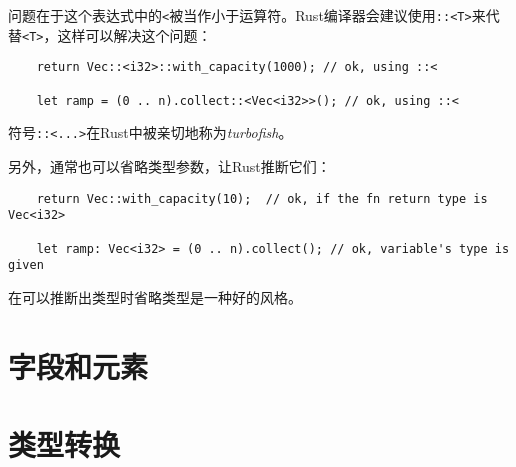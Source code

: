问题在于这个表达式中的\texttt{<}被当作小于运算符。Rust编译器会建议使用\texttt{::<T>}来代替\texttt{<T>}，这样可以解决这个问题：
\begin{verbatim}
    return Vec::<i32>::with_capacity(1000); // ok, using ::<

    let ramp = (0 .. n).collect::<Vec<i32>>(); // ok, using ::<
\end{verbatim}

符号\texttt{::<...>}在Rust中被亲切地称为\emph{turbofish}。

另外，通常也可以省略类型参数，让Rust推断它们：
\begin{verbatim}
    return Vec::with_capacity(10);  // ok, if the fn return type is Vec<i32>

    let ramp: Vec<i32> = (0 .. n).collect(); // ok, variable's type is given
\end{verbatim}

在可以推断出类型时省略类型是一种好的风格。

\section{字段和元素}



\section{类型转换}\label{cast}
